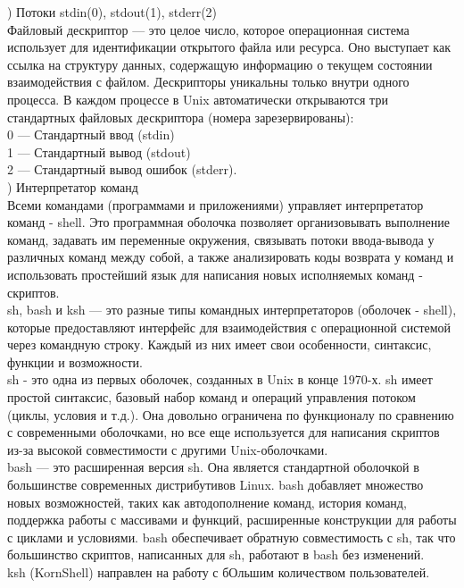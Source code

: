 ) Потоки stdin(0), stdout(1), stderr(2) \\
Файловый дескриптор — это целое число, которое операционная система использует для идентификации открытого файла или ресурса. Оно выступает как ссылка на структуру данных, содержащую информацию о текущем состоянии взаимодействия с файлом. Дескрипторы уникальны только внутри одного процесса.  В каждом процессе в Unix автоматически открываются три стандартных файловых дескриптора (номера зарезервированы): \\
0 — Стандартный ввод (stdin) \\
1 — Стандартный вывод (stdout) \\
2 — Стандартный вывод ошибок (stderr). \\

) Интерпретатор команд \\
Всеми командами (программами и приложениями) управляет интерпретатор команд - shell. Это программная оболочка позволяет организовывать выполнение команд, задавать им переменные окружения, связывать потоки ввода-вывода у различных команд между собой, а также анализировать коды возврата у команд и использовать простейший язык для написания новых исполняемых команд - скриптов. \\
sh, bash и ksh — это разные типы командных интерпретаторов (оболочек - shell), которые предоставляют интерфейс для взаимодействия с операционной системой через командную строку. Каждый из них имеет свои особенности, синтаксис, функции и возможности. \\
sh - это одна из первых оболочек, созданных в Unix в конце 1970-х. sh имеет простой синтаксис, базовый набор команд и операций управления потоком (циклы, условия и т.д.). Она довольно ограничена по функционалу по сравнению с современными оболочками, но все еще используется для написания скриптов из-за высокой совместимости с другими Unix-оболочками. \\
bash — это расширенная версия sh. Она является стандартной оболочкой в большинстве современных дистрибутивов Linux. bash добавляет множество новых возможностей, таких как автодополнение команд, история команд, поддержка работы с массивами и функций, расширенные конструкции для работы с циклами и условиями. bash обеспечивает обратную совместимость с sh, так что большинство скриптов, написанных для sh, работают в bash без изменений. \\
ksh (KornShell) направлен на работу с бОльшим количеством пользователей. \\

